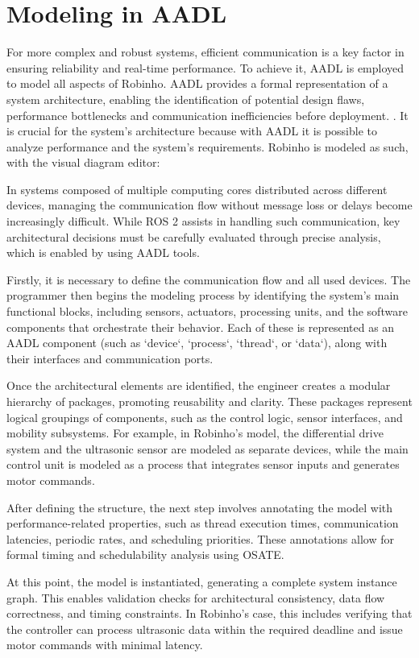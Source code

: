 \chapter{Modeling in AADL}
For more complex and robust systems, efficient communication is a key factor in ensuring reliability and real-time performance. To achieve it, AADL is employed to model all aspects of Robinho.
AADL provides a formal representation of a system architecture, enabling the identification of potential design flaws, performance bottlenecks and communication inefficiencies before deployment. \cite{Santos2024}. It is crucial for the system's architecture because with AADL it is possible to analyze performance and the system's requirements. Robinho is modeled as such, with the visual diagram editor:

In systems composed of multiple computing cores distributed across different devices, managing the communication flow without message loss or delays become increasingly difficult. While ROS 2 assists in handling such communication, key architectural decisions must be carefully evaluated through precise analysis, which is enabled by using AADL tools.

Firstly, it is necessary to define the communication flow and all used devices. The programmer then begins the modeling process by identifying the system’s main functional blocks, including sensors, actuators, processing units, and the software components that orchestrate their behavior. Each of these is represented as an AADL component (such as `device`, `process`, `thread`, or `data`), along with their interfaces and communication ports.

Once the architectural elements are identified, the engineer creates a modular hierarchy of packages, promoting reusability and clarity. These packages represent logical groupings of components, such as the control logic, sensor interfaces, and mobility subsystems. For example, in Robinho’s model, the differential drive system and the ultrasonic sensor are modeled as separate devices, while the main control unit is modeled as a process that integrates sensor inputs and generates motor commands.

After defining the structure, the next step involves annotating the model with performance-related properties, such as thread execution times, communication latencies, periodic rates, and scheduling priorities. These annotations allow for formal timing and schedulability analysis using OSATE.

At this point, the model is instantiated, generating a complete system instance graph. This enables validation checks for architectural consistency, data flow correctness, and timing constraints. In Robinho’s case, this includes verifying that the controller can process ultrasonic data within the required deadline and issue motor commands with minimal latency.

